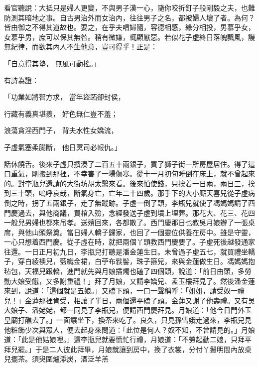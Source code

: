 \begin{showcontents}{}
看官聽說：大抵只是婦人更變，不與男子漢一心，隨你咬折釘子般剛毅之夫，也難防測其暗地之事。自古男治外而女治內，往往男子之名，都被婦人壞了者。為何？皆由御之不得其道故也。要之，在乎夫唱婦隨，容德相感，緣分相投，男慕乎女，女慕乎男，庶可以保其無咎。稍有微嫌，輒顯厭惡。若似花子虛終日落魄飄風，謾無紀律，而欲其內人不生他意，豈可得乎！正是：

「自意得其墊，  無風可動搖。」

有詩為證：

「功業如將智方求，  當年盜跖卻封侯，

行藏有義真堪羨，  好色無仁豈不羞；

浪蕩貪淫西門子，  背夫水性女嬌流，

子虛氣塞柔腸斷，  他日冥司必報仇。」

話休饒舌。後來子虛只擯湊了二百五十兩銀子，買了獅子街一所房屋居住。得了這口重氣，剛搬到那裡，不幸害了一場傷寒。從十一月初旬睡倒在床上，就不曾起來的。對李瓶兒還請的大街坊胡太醫來看。後來怕使錢，只挨着一日兩，兩日三，挨到三十頭，嗚呼哀哉，斷氣身亡，亡年二十四歲。那手下的大小廝天喜兒從子虛病倒之時，拐了五兩銀子，走了無蹤跡。子虛一倒了頭，李瓶兒就使了馮媽媽請了西門慶過去，與他商議，買棺入殮，念經發送子虛到墳上埋葬。那花大、花三、花四一般兒男婦也都來吊孝。送殯回來，各都散了。西門慶那日也教吳月娘辦了一張桌席，與他山頭祭奠。當日婦人轎子歸家，也回了一個靈位供養在房中。雖是守靈，一心只想着西門慶。從子虛在時，就把兩個丫頭教西門慶要了。子虛死後越發通家往還。一日正月初九日，李瓶兒打聽是潘金蓮生日。未曾過子虛五七，就買禮坐轎子，穿白綾襖兒，藍織金裙，白苧布䯼髻，珠子箍兒，來與金蓮做生日。馮媽媽抱毡包，天福兒跟轎，進門就先與月娘插燭也磕了四個頭，說道：「前日由頭，多勞動大娘受餓，又多謝重禮！」拜了月娘，又請李嬌兒、孟玉樓拜見了。然後潘金蓮來到，說道：「這個就是五娘。」又磕下頭，一口一聲稱呼：「姐姐，請受奴一禮兒！」金蓮那裡肯受，相讓了半日，兩個還平磕了頭。金蓮又謝了他壽禮。又有吳大娘子、潘姥姥，都一同見了李瓶兒，便請西門慶拜見。月娘道：「他今日門外玉皇廟打醮去了。」一面讓坐下，換茶來吃了。良久，只見孫雪娥走過來，李瓶兒見他粧飾少次與眾人，便去起身來問道：「此位是何人？奴不知，不曾請見的。」月娘道：「此是他姑娘哩。」這李瓶兒就要慌忙行禮，月娘道：「不勞起動二娘，只拜平拜兒罷。」于是二人彼此拜畢，月娘就讓到房中，換了衣裳，分付丫鬟明間內放桌兒擺茶。須臾圍爐添炭，酒泛羊羔 
\end{showcontents}
